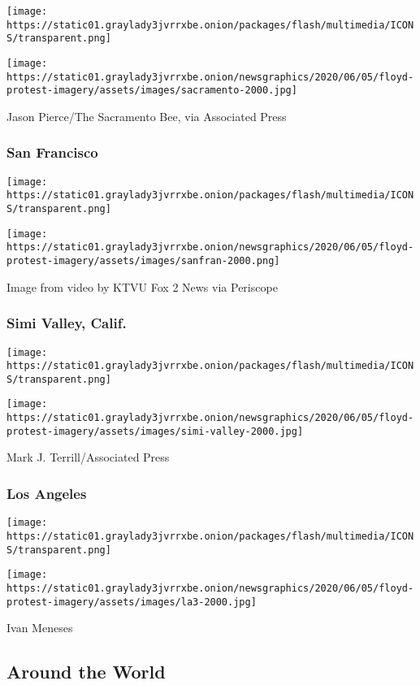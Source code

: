 \texttt{[image: https://static01.graylady3jvrrxbe.onion/packages/flash/multimedia/ICONS/transparent.png]}

\texttt{[image: https://static01.graylady3jvrrxbe.onion/newsgraphics/2020/06/05/floyd-protest-imagery/assets/images/sacramento-2000.jpg]}

Jason Pierce/The Sacramento Bee, via Associated Press

\hypertarget{san-francisco}{%
\subsubsection{San Francisco}\label{san-francisco}}

\texttt{[image: https://static01.graylady3jvrrxbe.onion/packages/flash/multimedia/ICONS/transparent.png]}

\texttt{[image: https://static01.graylady3jvrrxbe.onion/newsgraphics/2020/06/05/floyd-protest-imagery/assets/images/sanfran-2000.png]}

Image from video by KTVU Fox 2 News via Periscope

\hypertarget{simi-valley-calif}{%
\subsubsection{Simi Valley, Calif.}\label{simi-valley-calif}}

\texttt{[image: https://static01.graylady3jvrrxbe.onion/packages/flash/multimedia/ICONS/transparent.png]}

\texttt{[image: https://static01.graylady3jvrrxbe.onion/newsgraphics/2020/06/05/floyd-protest-imagery/assets/images/simi-valley-2000.jpg]}

Mark J. Terrill/Associated Press

\hypertarget{los-angeles}{%
\subsubsection{Los Angeles}\label{los-angeles}}

\texttt{[image: https://static01.graylady3jvrrxbe.onion/packages/flash/multimedia/ICONS/transparent.png]}

\texttt{[image: https://static01.graylady3jvrrxbe.onion/newsgraphics/2020/06/05/floyd-protest-imagery/assets/images/la3-2000.jpg]}

Ivan Meneses

\hypertarget{around-the-world}{%
\subsection{Around the World}\label{around-the-world}}

